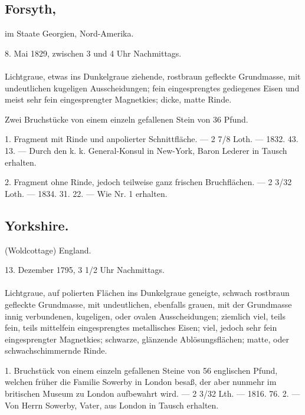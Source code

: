 \documentclass[a4paper, 11pt, oneside, polutonikogreek, german]{article}
\begin{document}
\subsection[Forsyth.]{Forsyth,}
\begin{center}
\small
im Staate Georgien, Nord-Amerika.

8. Mai 1829, zwischen 3 und 4 Uhr Nachmittags.
\end{center}
\paragraph{}
Lichtgraue, etwas ins Dunkelgraue ziehende, rostbraun gefleckte Grundmasse, mit undeutlichen kugeligen Ausscheidungen; fein eingesprengtes gediegenes Eisen und meist sehr fein eingesprengter Magnetkies; dicke, matte Rinde.

Zwei Bruchstücke von einem einzeln gefallenen Stein von 36 Pfund.

1. Fragment mit Rinde und anpolierter Schnittfläche. — 2 7/8 Loth. — 1832. 43. 13. — Durch den k. k. General-Konsul in New-York, Baron Lederer in Tausch erhalten.

2. Fragment ohne Rinde, jedoch teilweise ganz frischen Bruchflächen. — 2 3/32 Loth. — 1834. 31. 22. — Wie Nr. 1 erhalten.
\subsection{Yorkshire.}
\begin{center}
\small
(Woldcottage) England.

13. Dezember 1795, 3 1/2 Uhr Nachmittags.
\end{center}
\paragraph{}
Lichtgraue, auf polierten Flächen ins Dunkelgraue geneigte, schwach rostbraun gefleckte Grundmasse, mit undeutlichen, ebenfalls grauen, mit der Grundmasse innig verbundenen, kugeligen, oder ovalen Ausscheidungen; ziemlich viel, teils fein, teils mittelfein eingesprengtes metallisches Eisen; viel, jedoch sehr fein eingesprengter Magnetkies; schwarze, glänzende Ablösungsflächen; matte, oder schwachschimmernde Rinde.

1. Bruchstück von einem einzeln gefallenen Steine von 56 englischen Pfund, welchen früher die Familie Sowerby in London besaß, der aber nunmehr im britischen Museum zu London aufbewahrt wird. — 2 3/32 Lth. — 1816. 76. 2. — Von Herrn Sowerby, Vater, aus London in Tausch erhalten.
\end{document}
